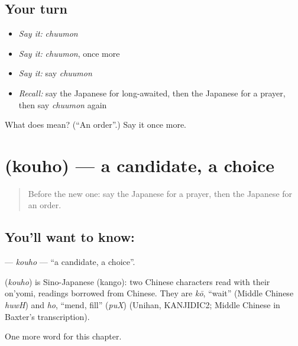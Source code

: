 \subsection*{Your turn}
\begin{itemize}
\raggedright
  \item \emph{Say it:} \emph{chuumon}
  \item \emph{Say it:} \emph{chuumon}, once more
  \item \emph{Say it:} say \emph{chuumon}
  \item \emph{Recall:} say the Japanese for long-awaited, then the Japanese for a prayer, then say \emph{chuumon} again
\end{itemize}

\begin{tcolorbox}[breakable,colback=teal!4,colframe=teal!35!black,title={Before you move on}]
What does  mean? (\textquotedblleft{}An order\textquotedblright{}.) Say it once more.
\end{tcolorbox}
\section[\texorpdfstring{\ja{こうほ} (kouho)}{こうほ (kouho)}]{ (kouho) — a candidate, a choice}

\label{lesson:JA-C93-kouho}



\begin{quote}
Before the new one: say the Japanese for a prayer, then the Japanese for an order.
\end{quote}

\subsection*{You'll want to know: }
\textbf{} — \emph{kouho} — \textquotedblleft{}a candidate, a choice\textquotedblright{}.

\begin{cousinweb}
\textbf{} (\emph{kouho}) is Sino-Japanese (kango): two Chinese characters read with their on'yomi, readings borrowed from Chinese. They are \emph{kō}, \textquotedblleft{}wait\textquotedblright{} (Middle Chinese \emph{huwH}) and \emph{ho}, \textquotedblleft{}mend, fill\textquotedblright{} (\emph{puX}) (Unihan, KANJIDIC2; Middle Chinese in Baxter's transcription).
\end{cousinweb}

\begin{grammarlens}[title={What you've built}]
One more word for this chapter.
\end{grammarlens}


